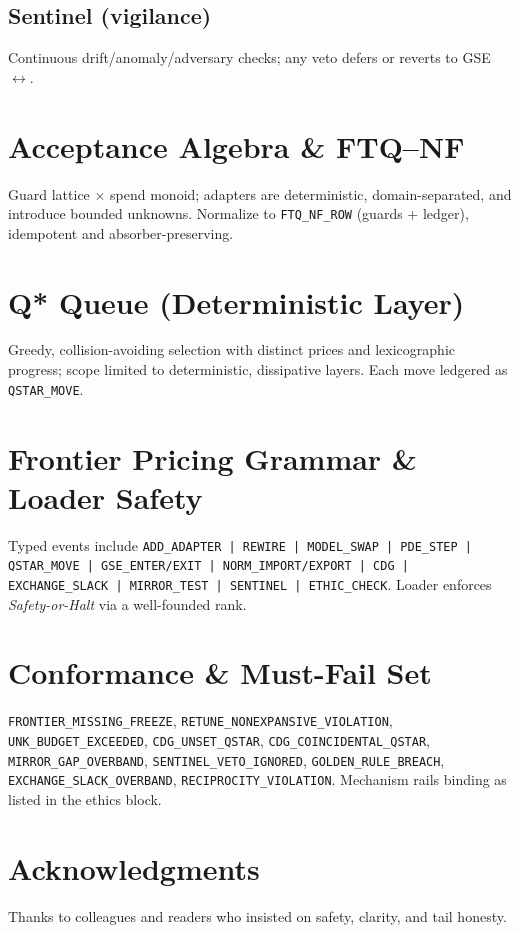 \documentclass[11pt]{article}
\begin{document}
\subsection*{Sentinel (vigilance)}
Continuous drift/anomaly/adversary checks; any veto defers or reverts to GSE\texorpdfstring{$\leftrightarrow$}{↔}.

\section{Acceptance Algebra \& FTQ--NF}
Guard lattice $\times$ spend monoid; adapters are deterministic, domain-separated, and introduce bounded unknowns. Normalize to \texttt{FTQ\_NF\_ROW} (guards + ledger), idempotent and absorber-preserving.

\section{Q* Queue (Deterministic Layer)}
Greedy, collision-avoiding selection with distinct prices and lexicographic progress; scope limited to deterministic, dissipative layers. Each move ledgered as \texttt{QSTAR\_MOVE}.

\section{Frontier Pricing Grammar \& Loader Safety}
Typed events include \texttt{ADD\_ADAPTER | REWIRE | MODEL\_SWAP | PDE\_STEP | QSTAR\_MOVE | GSE\_ENTER/EXIT | NORM\_IMPORT/EXPORT | CDG | EXCHANGE\_SLACK | MIRROR\_TEST | SENTINEL | ETHIC\_CHECK}. Loader enforces \emph{Safety-or-Halt} via a well-founded rank.

\section{Conformance \& Must-Fail Set}
\texttt{FRONTIER\_MISSING\_FREEZE}, \texttt{RETUNE\_NONEXPANSIVE\_VIOLATION}, \texttt{UNK\_BUDGET\_EXCEEDED}, \texttt{CDG\_UNSET\_QSTAR}, \texttt{CDG\_COINCIDENTAL\_QSTAR}, \texttt{MIRROR\_GAP\_OVERBAND}, \texttt{SENTINEL\_VETO\_IGNORED}, \texttt{GOLDEN\_RULE\_BREACH}, \texttt{EXCHANGE\_SLACK\_OVERBAND}, \texttt{RECIPROCITY\_VIOLATION}. Mechanism rails binding as listed in the ethics block.

\section*{Acknowledgments}
Thanks to colleagues and readers who insisted on safety, clarity, and tail honesty.
\end{document}

